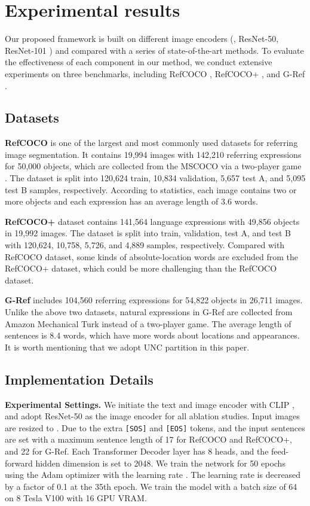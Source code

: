 \documentclass[10pt,twocolumn,letterpaper]{article}
\begin{document}
\section{Experimental results}\label{sec:Experiments}
Our proposed framework is built on different image encoders (\eg, ResNet-50, ResNet-101 \cite{he2016deep}) and compared with a series of state-of-the-art methods.
To evaluate the effectiveness of each component in our method, we conduct extensive experiments on three benchmarks, including RefCOCO \cite{kazemzadeh2014referitgame}, RefCOCO+ \cite{kazemzadeh2014referitgame}, and G-Ref \cite{mao2016generation}.

\subsection{Datasets}
\textbf{RefCOCO} \cite{kazemzadeh2014referitgame} is one of the largest and most commonly used datasets for referring image segmentation.
It contains 19,994 images with 142,210 referring expressions for 50,000 objects,
which are collected from the MSCOCO \cite{lin2014microsoft} via a two-player game \cite{kazemzadeh2014referitgame}.
The dataset is split into 120,624 train, 10,834 validation, 5,657 test A, and 5,095 test B samples, respectively.
According to statistics, each image contains two or more objects and each expression has an average length of 3.6 words.

\textbf{RefCOCO+} \cite{kazemzadeh2014referitgame} dataset contains 141,564 language expressions with 49,856 objects in 19,992 images.
The dataset is split into train, validation, test A, and test B with 120,624, 10,758, 5,726, and 4,889 samples, respectively.
Compared with RefCOCO dataset, some kinds of absolute-location words are excluded from the RefCOCO+ dataset, which could be more challenging than the RefCOCO dataset.

\textbf{G-Ref} \cite{nagaraja2016modeling} includes 104,560 referring expressions for 54,822 objects in 26,711 images.
Unlike the above two datasets, natural expressions in G-Ref are collected from Amazon Mechanical Turk instead of a two-player game.
The average length of sentences is 8.4 words, which have more words about locations and appearances.
It is worth mentioning that we adopt UNC partition in this paper.

\subsection{Implementation Details}
\textbf{Experimental Settings.} 
We initiate the text and image encoder with CLIP \cite{radford2021learning}, and adopt ResNet-50 \cite{he2016deep} as the image encoder for all ablation studies.
Input images are resized to .
Due to the extra \texttt{[SOS]} and \texttt{[EOS]} tokens, and the input sentences are set with a maximum sentence length of 17 for RefCOCO and RefCOCO+, and 22 for G-Ref.
Each Transformer Decoder layer has 8 heads, and the feed-forward hidden dimension is set to 2048.
We train the network for 50 epochs using the Adam optimizer with the learning rate .
The learning rate is decreased by a factor of 0.1 at the 35th epoch.
We train the model with a batch size of 64 on 8 Tesla V100 with 16 GPU VRAM.
\end{document}
